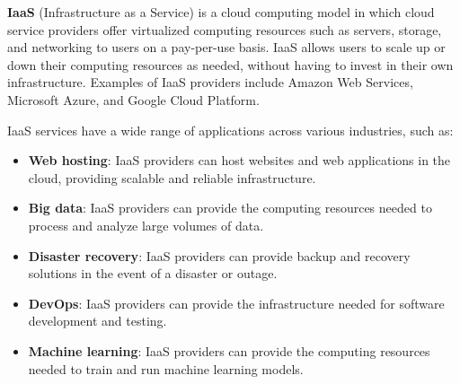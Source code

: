 \documentclass[../main.tex]{subfiles}
\begin{document}
\textbf{IaaS} (Infrastructure as a Service) is a cloud computing model in which cloud service providers offer virtualized computing resources such as servers, storage, and networking to users on a pay-per-use basis. IaaS allows users to scale up or down their computing resources as needed, without having to invest in their own infrastructure. Examples of IaaS providers include Amazon Web Services, Microsoft Azure, and Google Cloud Platform.

IaaS services have a wide range of applications across various industries, such as:
\begin{itemize}
    \item \textbf{Web hosting}: IaaS providers can host websites and web applications in the cloud, providing scalable and reliable infrastructure.
    \item \textbf{Big data}: IaaS providers can provide the computing resources needed to process and analyze large volumes of data.
    \item \textbf{Disaster recovery}: IaaS providers can provide backup and recovery solutions in the event of a disaster or outage.
    \item \textbf{DevOps}: IaaS providers can provide the infrastructure needed for software development and testing.
    \item \textbf{Machine learning}: IaaS providers can provide the computing resources needed to train and run machine learning models.
\end{itemize}
\end{document}
